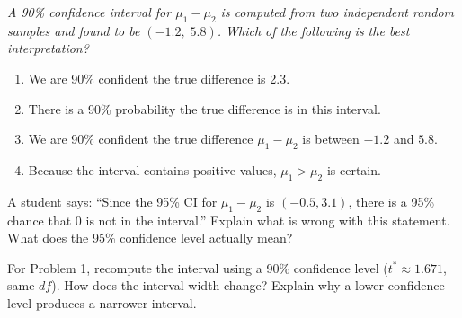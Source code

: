 \documentclass[10pt]{article}
\begin{document}
\begin{enumerate}
\textit{A 90\% confidence interval for $\mu_1 - \mu_2$ is computed from two independent
random samples and found to be $(-1.2,\; 5.8)$. Which of the following is the best
interpretation?}
\begin{enumerate}[label=(\Alph*)]
  \item We are 90\% confident the true difference is 2.3.
  \item There is a 90\% probability the true difference is in this interval.
  \item We are 90\% confident the true difference $\mu_1 - \mu_2$ is between $-1.2$ and $5.8$.
  \item Because the interval contains positive values, $\mu_1 > \mu_2$ is certain.\rule[-0.17in]{0pt}{0.47in}
        \hfill{}
\end{enumerate}

\end{enumerate}

\begin{reflectionbox}
A student says: ``Since the 95\% CI for $\mu_1 - \mu_2$ is $(-0.5, 3.1)$, there is a 95\%
chance that 0 is not in the interval.'' Explain what is wrong with this statement. What does
the 95\% confidence level actually mean?
\end{reflectionbox}

\begin{extensionbox}
For Problem 1, recompute the interval using a 90\% confidence level ($t^* \approx 1.671$,
same $df$). How does the interval width change? Explain why a lower confidence level produces
a narrower interval.
\end{extensionbox}
\end{document}
